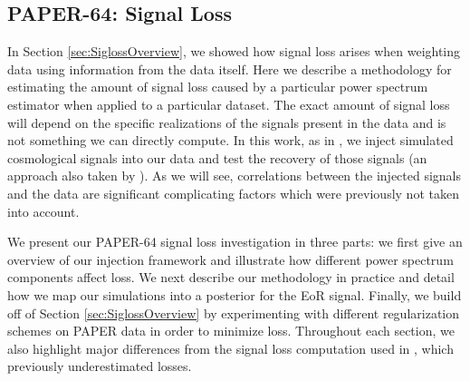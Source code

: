 \documentclass[preprint2,numberedappendix,tighten]{aastex6}  %
\begin{document}

\subsection{PAPER-64: Signal Loss}
\label{sec:Sigloss}

In Section \ref{sec:SiglossOverview}, we showed how signal loss arises when weighting data using information from the data itself. Here we describe a methodology for estimating the amount of signal loss caused by a particular power spectrum estimator when applied to a particular dataset. The exact amount of signal loss will depend on the specific realizations of the signals present in the data and is not something we can directly compute. In this work, as in , we inject simulated cosmological signals into our data and test the recovery of those signals (an approach also taken by \citet{masui_et_al2013}). As we will see, correlations between the injected signals and the data are significant complicating factors which were previously not taken into account. 

We present our PAPER-64 signal loss investigation in three parts: we first give an overview of our injection framework and illustrate how different power spectrum components affect loss. We next describe our methodology in practice and detail how we map our simulations into a posterior for the EoR signal. Finally, we build off of Section \ref{sec:SiglossOverview} by experimenting with different regularization schemes on PAPER data in order to minimize loss. Throughout each section, we also highlight major differences from the signal loss computation used in , which previously underestimated losses.

\end{document}
